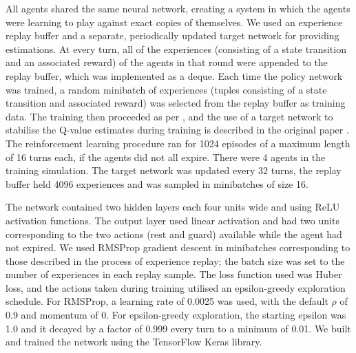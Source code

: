 \documentclass{article}
\begin{document}
All agents shared the same neural network, creating a system in which the
agents were learning to play against exact copies of themselves.
%
We used an experience replay buffer and a separate, periodically updated target
network for providing estimations.
%
At every turn, all of the experiences (consisting of a state transition and an
associated reward) of the agents in that round were appended to the replay
buffer, which was implemented as a deque. 
%
Each time the policy network was trained, a random minibatch of experiences
(tuples consisting of a state transition and associated reward) was selected
from the replay buffer as training data.
%
The training then proceeded as per \cite{Mnih+15}, and the use of a target
network to stabilise the Q-value estimates during training is described in
the original paper \cite{HaaseltGS16}.
%
The reinforcement learning procedure ran for 1024 episodes of a maximum length
of 16 turns each, if the agents did not all expire. There were 4 agents in the
training simulation. The target network was updated every 32 turns, the replay
buffer held 4096 experiences and was sampled in minibatches of size 16.

The network contained two hidden layers each four units wide and using ReLU
activation functions. The output layer used linear activation and had two units
corresponding to the two actions (rest and guard) available while the agent had
not expired. We used RMSProp gradient descent in minibatches corresponding to
those described in the process of experience replay; the batch size was set to
the number of experiences in each replay sample. The loss function used was
Huber loss, and the actions taken during training utilised an epsilon-greedy
exploration schedule.
%
For RMSProp, a learning rate of 0.0025 was used, with the default $\rho$ of 0.9
and momentum of 0. For epsilon-greedy exploration, the starting epsilon was 1.0
and it decayed by a factor of 0.999 every turn to a minimum of 0.01. We built
and trained the network using the TensorFlow Keras library.






\end{document}

